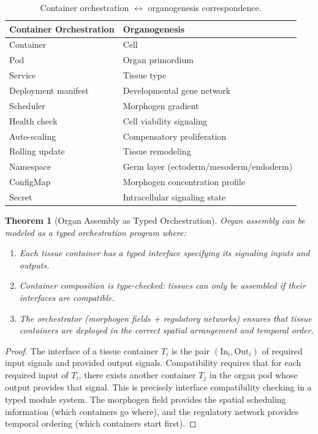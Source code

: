 \documentclass[12pt,a4paper]{article}
\newtheorem{theorem}{Theorem}[section]
\begin{document}
\begin{table}[H]
\centering
\begin{tabular}{ll}
\toprule
\textbf{Container Orchestration} & \textbf{Organogenesis} \\
\midrule
Container & Cell \\
Pod & Organ primordium \\
Service & Tissue type \\
Deployment manifest & Developmental gene network \\
Scheduler & Morphogen gradient \\
Health check & Cell viability signaling \\
Auto-scaling & Compensatory proliferation \\
Rolling update & Tissue remodeling \\
Namespace & Germ layer (ectoderm/mesoderm/endoderm) \\
ConfigMap & Morphogen concentration profile \\
Secret & Intracellular signaling state \\
\bottomrule
\end{tabular}
\caption{Container orchestration $\leftrightarrow$ organogenesis correspondence.}
\label{tab:orchestration}
\end{table}

\begin{theorem}[Organ Assembly as Typed Orchestration]\label{thm:organ-orch}
Organ assembly can be modeled as a typed orchestration program where:
\begin{enumerate}
  \item Each tissue container has a typed interface specifying its
    signaling inputs and outputs.
  \item Container composition is type-checked: tissues can only
    be assembled if their interfaces are compatible.
  \item The orchestrator (morphogen fields + regulatory networks)
    ensures that tissue containers are deployed in the correct
    spatial arrangement and temporal order.
\end{enumerate}
\end{theorem}

\begin{proof}
The interface of a tissue container $T_i$ is the pair
$(\text{In}_i, \text{Out}_i)$ of required input signals and
provided output signals.  Compatibility requires that for each
required input of $T_i$, there exists another container $T_j$
in the organ pod whose output provides that signal.  This is
precisely interface compatibility checking in a typed module system.
The morphogen field provides the spatial scheduling information
(which containers go where), and the regulatory network provides
temporal ordering (which containers start first).
\end{proof}
\end{document}
